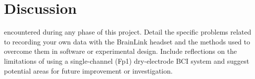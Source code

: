 \section{Discussion}\label{sec:discussion}

 encountered during any phase of this project. Detail the specific problems related to recording your own data with the BrainLink headset and the methods used to overcome them in software or experimental design. Include reflections on the limitations of using a single-channel (Fp1) dry-electrode BCI system and suggest potential areas for future improvement or investigation.